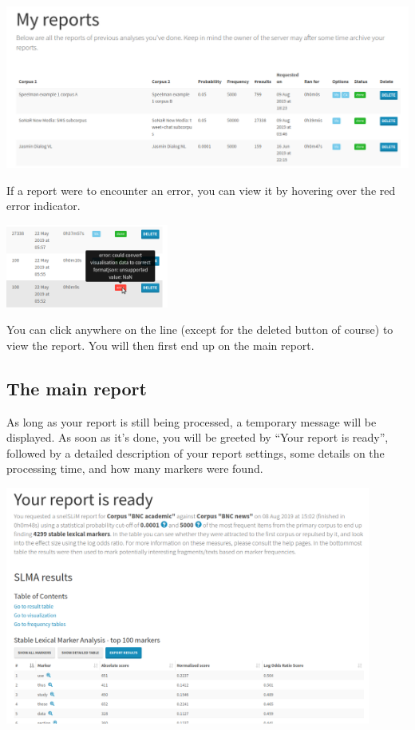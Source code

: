 \documentclass[11pt,a4paper]{article}
\begin{document}
\centerline{\includegraphics[width=\textwidth]{images/myreports.png}}

If a report were to encounter an error, you can view it by hovering over the red error indicator.

\centerline{\includegraphics[width=0.4\textwidth]{images/reporterror.png}}

You can click anywhere on the line (except for the deleted button of course) to view the report. You will then first end up on the main report.

\subsection{The main report}

As long as your report is still being processed, a temporary message will be displayed. As soon as it's done, you will be greeted by ``Your report is ready'', followed by a detailed description of your report settings, some details on the processing time, and how many markers were found. 

\centerline{\includegraphics[width=0.9\textwidth]{images/mainreport.png}}
\end{document}
